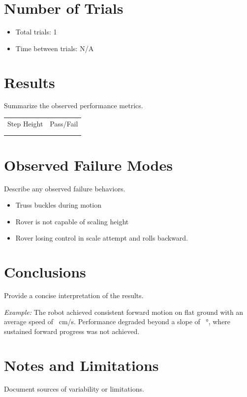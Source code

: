 \documentclass[11pt]{article}
\begin{document}
\section*{Number of Trials}
\begin{itemize}[noitemsep]
    \item Total trials: 1
    \item Time between trials: N/A
\end{itemize}

\section*{Results}
Summarize the observed performance metrics.

\begin{center}
\begin{tabular}{lc}
\toprule
Step Height& Pass/Fail\\
 &\\
\midrule
&  \\
\end{tabular}
\end{center}

\section*{Observed Failure Modes}
Describe any observed failure behaviors.

\begin{itemize}[noitemsep]
    \item Truss buckles during motion
    \item Rover is not capable of scaling height
    \item Rover losing control in scale attempt and rolls backward.
\end{itemize}

\section*{Conclusions}
Provide a concise interpretation of the results.

\textit{Example:} The robot achieved consistent forward motion on flat ground with an average speed of \underline{\hspace{1 cm}}~cm/s. Performance degraded beyond a slope of \underline{\hspace{1 cm}}~\si{\degree}, where sustained forward progress was not achieved.

\section*{Notes and Limitations}
Document sources of variability or limitations.
\end{document}
